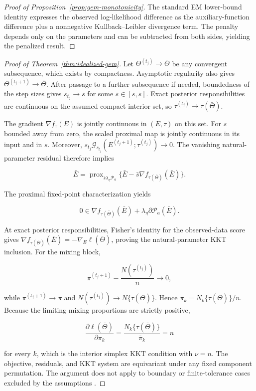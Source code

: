 \documentclass[preprint,12pt,authoryear]{elsarticle}
\begin{document}
\begin{proof}[Proof of Proposition~\ref{prop:gem-monotonicity}]
The standard EM lower-bound identity expresses the observed log-likelihood
difference as the auxiliary-function difference plus a nonnegative
Kullback--Leibler divergence term. The penalty depends only on the parameters
and can be subtracted from both sides, yielding the penalized result.
\end{proof}

\begin{proof}[Proof of Theorem~\ref{thm:idealized-gem}]
Let $\Theta^{(t_j)}\to\bar\Theta$ be any convergent subsequence, which exists
by compactness. Asymptotic regularity also gives
$\Theta^{(t_j+1)}\to\bar\Theta$. After passage to a further subsequence if
needed, boundedness of the step sizes gives $s_{t_j}\to\bar s$ for some
$\bar s\in[\underline s,\overline s]$. Exact posterior responsibilities are
continuous on the assumed compact interior set, so
$\tau^{(t_j)}\to\tau(\bar\Theta)$.

The gradient $\nabla f_\tau(E)$ is jointly continuous in $(E,\tau)$ on this
set. For $s$ bounded away from zero, the scaled proximal map is jointly
continuous in its input and in $s$. Moreover,
$s_{t_j}\mathcal G_{s_{t_j}}
(E^{(t_j+1)};\tau^{(t_j)})\to0$. The vanishing natural-parameter residual
therefore implies

\[
\bar E
=\operatorname{prox}_{\bar s\lambda_\eta\mathcal P_a}
\{\bar E-\bar s\nabla f_{\tau(\bar\Theta)}(\bar E)\}.
\]

The proximal fixed-point characterization yields

\[
0
\in
\nabla f_{\tau(\bar\Theta)}(\bar E)
+\lambda_\eta\partial\mathcal P_a(\bar E).
\]

At exact posterior responsibilities, Fisher's identity for the observed-data
score gives
$\nabla f_{\tau(\bar\Theta)}(\bar E)=-\nabla_E\ell(\bar\Theta)$, proving the
natural-parameter KKT inclusion. For the mixing block,

\[
\pi^{(t_j+1)}-\frac{N(\tau^{(t_j)})}{n}\longrightarrow0,
\]

while $\pi^{(t_j+1)}\to\bar\pi$ and
$N(\tau^{(t_j)})\to N\{\tau(\bar\Theta)\}$. Hence
$\bar\pi_k=N_k\{\tau(\bar\Theta)\}/n$. Because the limiting mixing proportions are
strictly positive,

\[
\frac{\partial\ell(\bar\Theta)}{\partial\pi_k}
=\frac{N_k\{\tau(\bar\Theta)\}}{\bar\pi_k}
=n
\]

for every $k$, which is the interior simplex KKT condition with $\nu=n$.
The objective, residuals, and KKT system are equivariant under any fixed
component permutation. The argument does not apply to boundary or
finite-tolerance cases excluded by the assumptions
\citep{green1990penalizedem,wu1983em,tseng2004emproximal}.
\end{proof}
\end{document}
